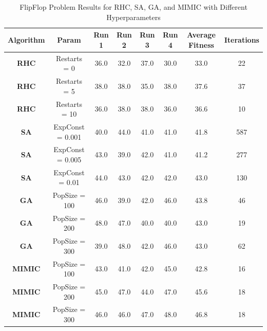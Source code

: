 \begin{table}[h!]
    \centering
    \caption{FlipFlop Problem Results for RHC, SA, GA, and MIMIC with Different Hyperparameters}
    \begin{tabular}{|c|c|c|c|c|c|c|c|}
        \hline
        \textbf{Algorithm} & \textbf{Param} & \textbf{Run 1} & \textbf{Run 2} & \textbf{Run 3} & \textbf{Run 4} & \textbf{Average Fitness} & \textbf{Iterations} \\ \hline
        
        \textbf{RHC} & Restarts = 0 & 36.0 & 32.0 & 37.0 & 30.0 & 33.0 & 22 \\ \hline
        \textbf{RHC} & Restarts = 5 & 38.0 & 38.0 & 35.0 & 38.0 & 37.6 & 37 \\ \hline
        \textbf{RHC} & Restarts = 10 & 36.0 & 38.0 & 38.0 & 36.0 & 36.6 & 10 \\ \hline
        
        \textbf{SA} & ExpConst = 0.001 & 40.0 & 44.0 & 41.0 & 41.0 & 41.8 & 587 \\ \hline
        \textbf{SA} & ExpConst = 0.005 & 43.0 & 39.0 & 42.0 & 41.0 & 41.2 & 277 \\ \hline
        \textbf{SA} & ExpConst = 0.01 & 44.0 & 43.0 & 42.0 & 42.0 & 43.0 & 130 \\ \hline
        
        \textbf{GA} & PopSize = 100 & 46.0 & 39.0 & 42.0 & 46.0 & 43.8 & 46 \\ \hline
        \textbf{GA} & PopSize = 200 & 48.0 & 47.0 & 40.0 & 40.0 & 43.0 & 19 \\ \hline
        \textbf{GA} & PopSize = 300 & 39.0 & 48.0 & 42.0 & 46.0 & 43.0 & 62 \\ \hline
        
        \textbf{MIMIC} & PopSize = 100 & 43.0 & 41.0 & 42.0 & 45.0 & 42.8 & 16 \\ \hline
        \textbf{MIMIC} & PopSize = 200 & 45.0 & 47.0 & 44.0 & 47.0 & 45.6 & 18 \\ \hline
        \textbf{MIMIC} & PopSize = 300 & 46.0 & 46.0 & 47.0 & 48.0 & 46.8 & 18 \\ \hline
        
    \end{tabular}
    \label{tab:flipflop_results}
\end{table}

